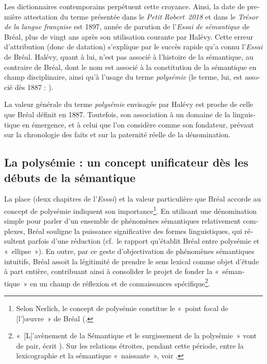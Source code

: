 \documentclass[output=paper]{langsci/langscibook}
\begin{document}
\begin{otherlanguage}{french}
Les dictionnaires contemporains perpétuent cette croyance. Ainsi, la date de première attestation du terme présentée dans le \textit{Petit} \textit{Robert~2018} et dans le \textit{Trésor} \textit{de} \textit{la} \textit{langue} \textit{française} est 1897, année de parution de l’\textit{Essai} \textit{de} \textit{sémantique} de Bréal, plus de vingt ans après son utilisation courante par Halévy. Cette erreur d’attribution (donc de datation) s’explique par le succès rapide qu’a connu l’\textit{Essai} de Bréal. Halévy, quant à lui, n’est pas associé à l’histoire de la sémantique, au contraire de Bréal, dont le nom est associé à la constitution de la sémantique en champ disciplinaire, ainsi qu’à l’usage du terme \textit{polysémie} (le terme, lui, est associé dès 1887 : \citealt{baale_bulletin_1887}).

La valeur générale du terme \textit{polysémie} envisagée par Halévy est proche de celle que Bréal définit en 1887. Toutefois, son association à un domaine de la linguistique en émergence, et à celui que l’on considère comme son fondateur, prévaut sur la chronologie des faits et sur la paternité réelle de la dénomination.

\subsection{La polysémie : un concept unificateur dès les débuts de la sémantique}

La place (deux chapitres de l’\textit{Essai}) et la valeur particulière que Bréal accorde au concept de polysémie indiquent son importance\footnote{ \textrm{Selon Nerlich, le concept de polysémie constitue le «~point focal de [l’]œuvre~» de Bréal (\citealt[22]{nerlich_avant-propos_1993}.}}. En utilisant une dénomination simple pour parler d’un ensemble de phénomènes sémantiques relativement complexes, Bréal souligne la puissance significative des formes linguistiques, qui résultent parfois d’une réduction (cf.~le rapport qu’établit Bréal entre polysémie et «~ellipse~»). En outre, par ce geste d’objectivation de phénomènes sémantiques intuitifs, Bréal assoit la légitimité de prendre le sens lexical comme objet d’étude à part entière, contribuant ainsi à consolider le projet de fonder la «~sémantique~» en un champ de réflexion et de connaissances spécifique\footnote{ \textrm{«~[L]’avènement de la Sémantique et le surgissement de la polysémie~» vont de pair, écrit \citet[83]{delesalle_vie_1987}). Sur les relations étroites, pendant cette période, entre la lexicographie et la sémantique «~naissante~», voir \citealt{bisconti_sens_2016}.}}.


\end{otherlanguage}
\end{document}

